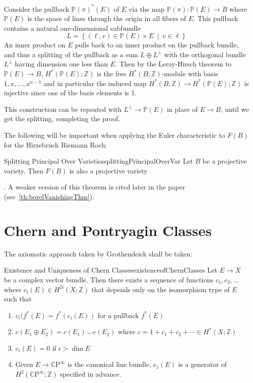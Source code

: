 \documentclass{book}
\newenvironment{Proof}[1][]
  {\begin{ProofTcb}[#1]}
  {\end{ProofTcb}}
\newcommand{\Z}{{\mathbb{Z}}}
\renewcommand{\P}{{\mathbb{P}}}
\newcommand{\CP}{{\mathbb{C}\mathrm{P}}}
\newcommand{\set}[2]{\left\{#1 \ \middle|\ #2\right\}}
\begin{document}
\begin{Proof}
	Consider the pullback $\P(\pi)^*(E)$ of $E$ via the map $\P(\pi):\P(E) \to B$ where $\P(E)$ is the space of
	lines through the origin in all fibers of $E$. This pullback contains a natural one-dimensional subbundle
	\[
		L = \set{(\ell,v) \in \P(E) \times E}{v \in \ell}
	\]
	An inner product on $E$ pulls back to an inner product on the pullback bundle, and thus a splitting of
	the pullback as a sum $L \oplus L^\perp$ with the orthogonal bundle $L^\perp$ having dimension one less
	than $E$. Then by the Leray-Hirsch theorem to $\P(E) \to B$, $H^*(\P(E);\Z)$
	is the free $H^*(B;\Z)$-module with basis $1,x,\ldots,x^{n-1}$ and in particular the induced map
	$H^*(B;\Z) \to H^*(\P(E);\Z)$ is injective since one of the basis elements is 1.

	This construction can be repeated with $L^\perp \to \P(E)$ in place of $E \to B$, until we get the
	splitting, completing the proof.
\end{Proof}

The following will be important when applying the Euler characteristic to $F(B)$ for the Hirzebruch Riemann
Roch:

\begin{thm}{Splitting Principal Over Varieties}{splittingPrincipalOverVar}
  Let $B$ be a projective variety. Then $F(B)$ is also a projective variety
\end{thm}

\begin{Proof}
  \cite{HodgeTheory2014}. A weaker version of this theorem is cited later in the paper
  (see~\cref{th:borelVanishingThm}).
\end{Proof}

\section{Chern and Pontryagin Classes}

The axiomatic approach taken by Grothendeick shall be taken:

\begin{thm}{Existence and Uniqueness of Chern Classes}{existenceofChernClasses}
	Let $E \to X$ be a complex vector bundle. Then there exists a sequence of functions $c_1, c_2, ...$ where
	$c_i(E) \in H^{2i}(X; \Z)$ that depends only on the isomorphism type of $E$ such that
	\begin{enumerate}
		\item $c_i(f^*(E) = f^*(c_i(E))$ for a pullback $f^*(E)$
		\item $c(E_1\oplus E_2) = c(E_1)\smile c(E_2)$ where $c = 1 + c_1 + c_2 + \cdots \in H^*(X;\Z)$
		\item $c_i(E) = 0$ if $i > \dim E$
		\item Given $E \to \CP^\infty$ is the canonical line bundle, $c_1(E)$ is a generator of
			$H^2(\CP^\infty; \Z)$ specified in advance.
	\end{enumerate}
\end{thm}
\end{document}
